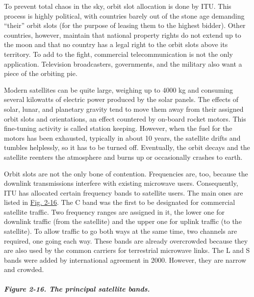 To prevent total chaos in the sky, orbit slot allocation is done by ITU.
This process is highly political, with countries barely out of the stone
age demanding ``their'' orbit slots (for the purpose of leasing them to
the highest bidder). Other countries, however, maintain that national
property rights do not extend up to the moon and that no country has a
legal right to the orbit slots above its territory. To add to the fight,
commercial telecommunication is not the only application. Television
broadcasters, governments, and the military also want a piece of the
orbiting pie.

Modern satellites can be quite large, weighing up to 4000 kg and
consuming several kilowatts of electric power produced by the solar
panels. The effects of solar, lunar, and planetary gravity tend to move
them away from their assigned orbit slots and orientations, an effect
countered by on-board rocket motors. This fine-tuning activity is called
{station keeping}. However, when the fuel for the motors has been
exhausted, typically in about 10 years, the satellite drifts and tumbles
helplessly, so it has to be turned off. Eventually, the orbit decays and
the satellite reenters the atmosphere and burns up or occasionally
crashes to earth.

Orbit slots are not the only bone of contention. Frequencies are, too,
because the downlink transmissions interfere with existing microwave
users. Consequently, ITU has allocated certain frequency bands to
satellite users. The main ones are listed in
\protect\hyperlink{0130661023_ch02lev1sec4.htmlux5cux23ch02fig16}{Fig.
2-16}. The C band was the first to be designated for commercial
satellite traffic. Two frequency ranges are assigned in it, the lower
one for downlink traffic (from the satellite) and the upper one for
uplink traffic (to the satellite). To allow traffic to go both ways at
the same time, two channels are required, one going each way. These
bands are already overcrowded because they are also used by the common
carriers for terrestrial microwave links. The L and S bands were added
by international agreement in 2000. However, they are narrow and
crowded.

\subparagraph[Figure 2-16. The principal satellite
bands.]{\texorpdfstring{\protect\hypertarget{0130661023_ch02lev1sec4.htmlux5cux23ch02fig16}{}{}Figure
2-16. The principal satellite
bands.}{Figure 2-16. The principal satellite bands.}}


